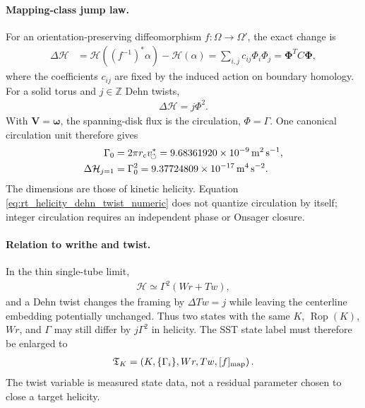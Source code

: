 \paragraph{Mapping-class jump law.}
For an orientation-preserving diffeomorphism $f:\Omega\to\Omega'$, the exact
change is
\begin{align}
    \Delta\mathcal H
    &=
    \mathcal H\!\left((f^{-1})^*\alpha\right)-\mathcal H(\alpha)
    =
    \sum_{i,j}c_{ij}\Phi_i\Phi_j
    =
    \boldsymbol\Phi^{\!T}C\boldsymbol\Phi,
    \label{eq:rt_helicity_mapping_class_quadratic}
\end{align}
where the coefficients $c_{ij}$ are fixed by the induced action on boundary
homology.  For a solid torus and $j\in\mathbb Z$ Dehn twists,
\begin{align}
    \Delta\mathcal H=j\Phi^2 .
    \label{eq:rt_helicity_dehn_twist_jump}
\end{align}
With $\mathbf V=\boldsymbol\omega$, the spanning-disk flux is the circulation,
$\Phi=\Gamma$.  One canonical circulation unit therefore gives
\begin{align}
    \Gamma_0
    &=2\pi r_cv_{\!\boldsymbol{\circlearrowleft}}^{\ast}
      =9.68361920\times10^{-9}\,{\rm m^2\,s^{-1}},\\
    \Delta\mathcal H_{j=1}
    &=\Gamma_0^2
      =9.37724809\times10^{-17}\,{\rm m^4\,s^{-2}}.
    \label{eq:rt_helicity_dehn_twist_numeric}
\end{align}
The dimensions are those of kinetic helicity.  Equation
\eqref{eq:rt_helicity_dehn_twist_numeric} does not quantize circulation by
itself; integer circulation requires an independent phase or Onsager closure.

\paragraph{Relation to writhe and twist.}
In the thin single-tube limit,
\begin{align}
    \mathcal H\simeq\Gamma^2(Wr+Tw),
    \label{eq:rt_helicity_wr_tw_sector}
\end{align}
and a Dehn twist changes the framing by $\Delta Tw=j$ while leaving the
centerline embedding potentially unchanged.  Thus two states with the same
$K$, $\operatorname{Rop}(K)$, $Wr$, and $\Gamma$ may still differ by
$j\Gamma^2$ in helicity.  The SST state label must therefore be enlarged to
\begin{align}
    \mathfrak T_K
    =
    \left(K,\{\Gamma_i\},Wr,Tw,[f]_{\rm map}\right).
    \label{eq:rt_helicity_state_label}
\end{align}
The twist variable is measured state data, not a residual parameter chosen to
close a target helicity.

